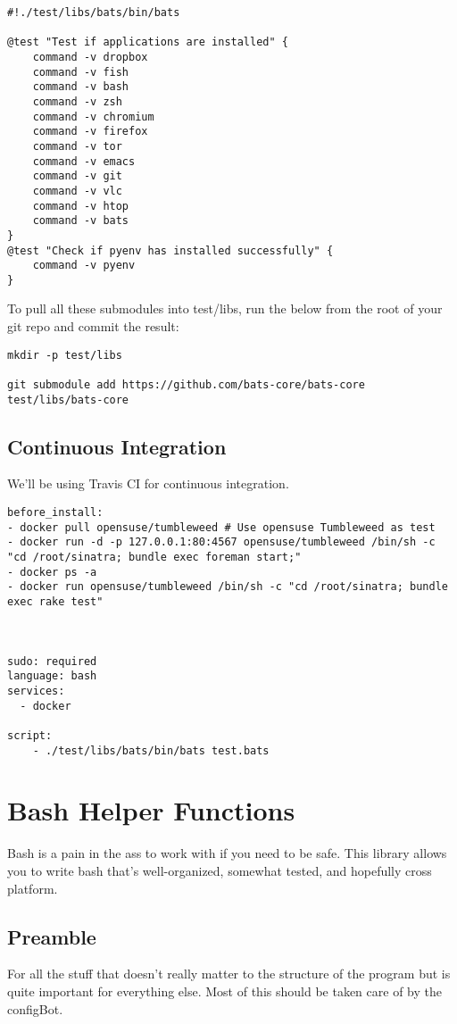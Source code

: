 \documentclass[11pt]{article}
\begin{document}
\begin{verbatim}
#!./test/libs/bats/bin/bats

@test "Test if applications are installed" {
    command -v dropbox
    command -v fish
    command -v bash
    command -v zsh
    command -v chromium
    command -v firefox
    command -v tor
    command -v emacs
    command -v git
    command -v vlc
    command -v htop
    command -v bats
}
@test "Check if pyenv has installed successfully" {
    command -v pyenv
}
\end{verbatim}

To pull all these submodules into test/libs, run the below from the root of your git repo and commit the result:
\begin{verbatim}
mkdir -p test/libs

git submodule add https://github.com/bats-core/bats-core test/libs/bats-core
\end{verbatim}

\subsection{Continuous Integration}
\label{sec:org479e571}
We'll be using Travis CI for continuous integration.

\begin{verbatim}
before_install: 
- docker pull opensuse/tumbleweed # Use opensuse Tumbleweed as test
- docker run -d -p 127.0.0.1:80:4567 opensuse/tumbleweed /bin/sh -c "cd /root/sinatra; bundle exec foreman start;"
- docker ps -a
- docker run opensuse/tumbleweed /bin/sh -c "cd /root/sinatra; bundle exec rake test"



sudo: required
language: bash
services:
  - docker

script:
    - ./test/libs/bats/bin/bats test.bats
\end{verbatim}


\section{Bash Helper Functions}
\label{sec:org8645d9c}
Bash is a pain in the ass to work with if you need to be safe. This library allows you to write bash that's well-organized, somewhat tested, and hopefully cross platform.

\subsection{Preamble}
\label{sec:org1114dc8}
For all the stuff that doesn't really matter to the structure of the program but is quite important for everything else.
Most of this should be taken care of by the configBot.
\end{document}
